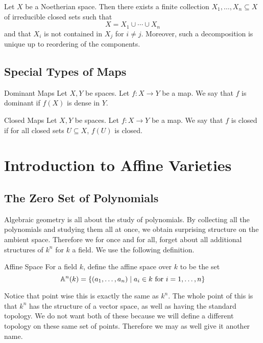 \documentclass[a4paper]{article}
\begin{document}
\begin{prp}{}{} Let $X$ be a Noetherian space. Then there exists a finite collection $X_1,\dots,X_n\subseteq X$ of irreducible closed sets such that $$X=X_1\cup\cdots\cup X_n$$ and that $X_i$ is not contained in $X_j$ for $i\neq j$. Moreover, such a decomposition is unique up to reordering of the components. 
\end{prp}

\subsection{Special Types of Maps}
\begin{defn}{Dominant Maps}{} Let $X,Y$ be spaces. Let $f:X\to Y$ be a map. We say that $f$ is dominant if $f(X)$ is dense in $Y$. 
\end{defn}

\begin{defn}{Closed Maps}{} Let $X,Y$ be spaces. Let $f:X\to Y$ be a map. We say that $f$ is closed if for all closed sets $U\subseteq X$, $f(U)$ is closed. 
\end{defn}

\pagebreak
\section{Introduction to Affine Varieties}
\subsection{The Zero Set of Polynomials}
Algebraic geometry is all about the study of polynomials. By collecting all the polynomials and studying them all at once, we obtain surprising structure on the ambient space. Therefore we for once and for all, forget about all additional structures of $k^n$ for $k$ a field. We use the following definition. 

\begin{defn}{Affine Space}{} For a field $k$, define the affine space over $k$ to be the set $$\mathbb{A}^n(k)=\{(a_1,\dots,a_n)\;|\;a_i\in k\text{ for }i=1,\dots,n\}$$
\end{defn}

Notice that point wise this is exactly the same as $k^n$. The whole point of this is that $k^n$ has the structure of a vector space, as well as having the standard topology. We do not want both of these because we will define a different topology on these same set of points. Therefore we may as well give it another name. 
\end{document}
